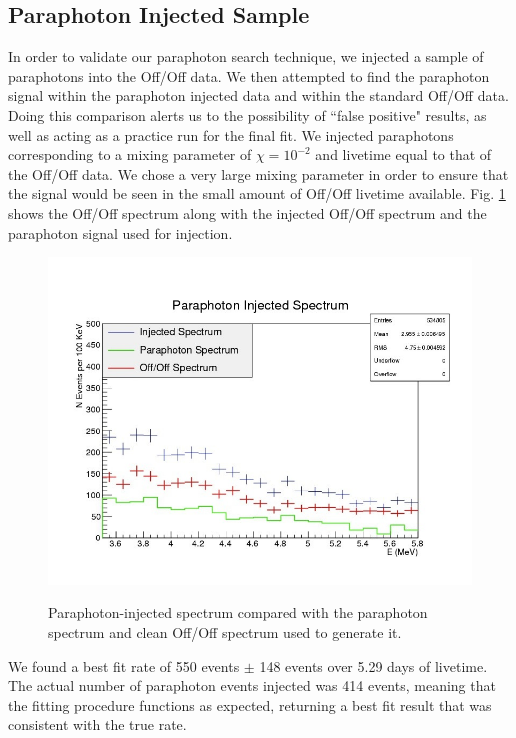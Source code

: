  

\subsection{Paraphoton Injected Sample}
In order to validate our paraphoton search technique, we injected a sample of paraphotons into the Off/Off data. We then attempted to find the paraphoton signal within the paraphoton injected data and within the standard Off/Off data. Doing this comparison alerts us to the possibility of ``false positive" results, as well as acting as a practice run for the final fit. We injected paraphotons corresponding to a mixing parameter of $\chi = 10^{-2}$ and livetime equal to that of the Off/Off data. We chose a very large mixing parameter in order to ensure that the signal would be seen in the small amount of Off/Off livetime available. Fig. \ref{Injected Sample} shows the Off/Off spectrum along with the injected Off/Off spectrum and the paraphoton signal used for injection.  

\begin{figure}
\caption{Paraphoton-injected spectrum compared with the paraphoton spectrum and clean Off/Off spectrum used to generate it.}
\includegraphics[width =\textwidth]{Paraphotons/Paraphoton_Injected_Spec.jpg}
\label{Injected Sample}
\end{figure}



We found a best fit rate of 550 events  $\pm$ 148 events over 5.29 days of livetime. The actual number of paraphoton events injected was 414 events, meaning that the fitting procedure functions as expected, returning a best fit result that was consistent with the true rate. 


